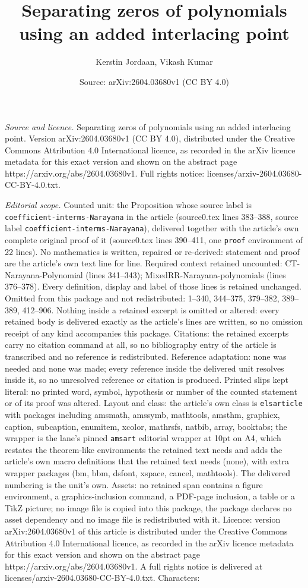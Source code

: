 \documentclass[10pt,a4paper]{amsart}
\title[Separating zeros of polynomials using an added interlacing p]{Separating zeros of polynomials using an added interlacing point}
\author{Kerstin Jordaan, Vikash Kumar}
\date{Source: arXiv:2604.03680v1 (CC BY 4.0)}
\begin{document}
\maketitle

\noindent\emph{Source and licence.} Separating zeros of polynomials using an added interlacing point. Version arXiv:2604.03680v1 (CC BY 4.0), distributed under the Creative Commons Attribution 4.0 International licence, as recorded in the arXiv licence metadata for this exact version and shown on the abstract page https://arxiv.org/abs/2604.03680v1. Full rights notice: licenses/arxiv-2604.03680-CC-BY-4.0.txt.\par\smallskip

\noindent\textit{Editorial scope.} Counted unit: the Proposition whose source label is \texttt{coefficient-interms-Narayana} in the article (source0.tex lines 383--388, source label \texttt{coefficient-interms-Narayana}), delivered together with the article's own complete original proof of it (source0.tex lines 390--411, one \texttt{proof} environment of 22 lines). No mathematics is written, repaired or re-derived: statement and proof are the article's own text line for line. Required context retained uncounted: CT-Narayana-Polynomial (lines 341--343); MixedRR-Narayana-polynomials (lines 376--378). Every definition, display and label of those lines is retained unchanged. Omitted from this package and not redistributed: 1--340, 344--375, 379--382, 389--389, 412--906. Nothing inside a retained excerpt is omitted or altered: every retained body is delivered exactly as the article's lines are written, so no omission receipt of any kind accompanies this package. Citations: the retained excerpts carry no citation command at all, so no bibliography entry of the article is transcribed and no reference is redistributed. Reference adaptation: none was needed and none was made; every reference inside the delivered unit resolves inside it, so no unresolved reference or citation is produced. Printed slips kept literal: no printed word, symbol, hypothesis or number of the counted statement or of its proof was altered. Layout and class: the article's own class is \texttt{elsarticle} with packages including amsmath, amssymb, mathtools, amsthm, graphicx, caption, subcaption, enumitem, xcolor, mathrsfs, natbib, array, booktabs; the wrapper is the lane's pinned \texttt{amsart} editorial wrapper at 10pt on A4, which restates the theorem-like environments the retained text needs and adds the article's own macro definitions that the retained text needs (none), with extra wrapper packages (bm, bbm, dsfont, xspace, cancel, mathtools). The delivered numbering is the unit's own. Assets: no retained span contains a figure environment, a graphics-inclusion command, a PDF-page inclusion, a table or a TikZ picture; no image file is copied into this package, the package declares no asset dependency and no image file is redistributed with it. Licence: version arXiv:2604.03680v1 of this article is distributed under the Creative Commons Attribution 4.0 International licence, as recorded in the arXiv licence metadata for this exact version and shown on the abstract page https://arxiv.org/abs/2604.03680v1. A full rights notice is delivered at licenses/arxiv-2604.03680-CC-BY-4.0.txt. Characters: 
\end{document}
